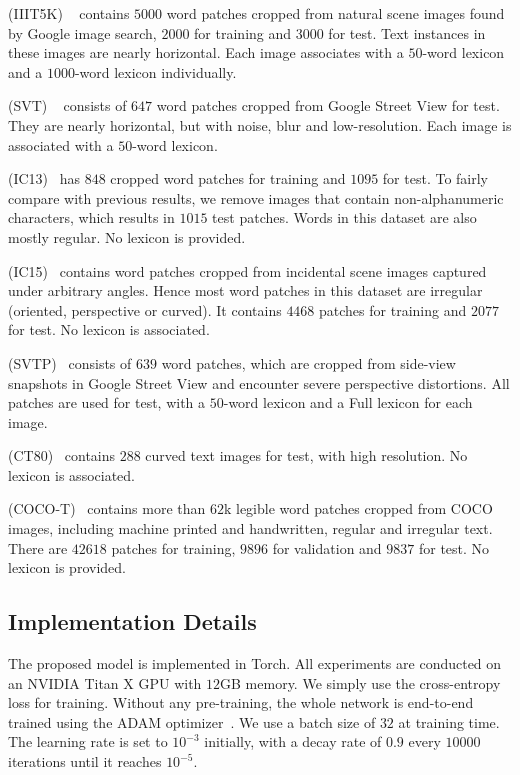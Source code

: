 \documentclass[letterpaper]{article} \usepackage{aaai19}  \usepackage{times}  \usepackage{helvet}  \usepackage{courier}  \usepackage{url}  \usepackage{graphicx}  \usepackage{amsmath}
\begin{document}
 (IIIT5K) ~\cite{MishraBMVC12}
contains $5000$ word patches cropped from natural scene images found by Google image search, $2000$ for training and $3000$ for test.
Text instances in these images are nearly horizontal. Each image associates with a $50$-word lexicon and a $1000$-word lexicon individually.

 (SVT) ~\cite{Wangkai2011}
consists of $647$ word patches cropped from Google Street View for test. They are nearly horizontal, but with noise, blur and low-resolution. Each image is associated with a $50$-word lexicon.

 (IC13)~\cite{icdar2013}
has $848$ cropped word patches for training and $1095$ for test. To fairly compare with previous results,
we remove images that contain non-alphanumeric characters, which results in $1015$ test patches.
Words in this dataset are also mostly regular. No lexicon is provided.

 (IC15)~\cite{icdar2015}
contains word patches cropped from incidental scene images captured under arbitrary angles.
Hence most word patches in this dataset are irregular (oriented, perspective or curved).
It contains $4468$ patches for training and $2077$ for test. No lexicon is associated.

 (SVTP)~\cite{SVTP}
consists of $639$ word patches, which are cropped from side-view snapshots in Google Street View and encounter severe perspective distortions.
All patches are used for test, with a $50$-word lexicon and a Full lexicon for each image.

 (CT80)~\cite{CT80}
contains $288$ curved text images for test, with high resolution. No lexicon is associated.

 (COCO-T)~\cite{cocotext}
contains more than $62$k legible word patches cropped from COCO images, including machine printed and handwritten, regular and irregular text.
There are $42618$ patches for training, $9896$ for validation and $9837$ for test. No lexicon is provided.

\subsection{Implementation Details}
The proposed model is implemented in Torch. All experiments are conducted on an NVIDIA Titan X GPU with $12$GB memory.
We simply use the cross-entropy loss for training. Without any pre-training, the whole network is end-to-end trained using the ADAM optimizer~\cite{adam14}.
We use a batch size of $32$ at training time. The learning rate is set to $10^{-3}$ initially, with a decay rate of $0.9$ every $10000$ iterations until it reaches $10^{-5}$.
\end{document}
